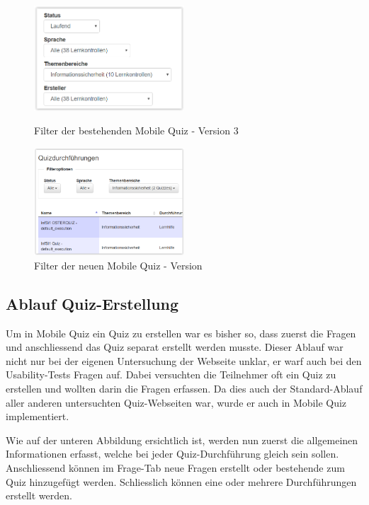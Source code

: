 \begin{figure}[H]
	\centering
	\includegraphics[width=0.5\textwidth]{Images/Alte_Filter_Mobile_Quiz.PNG}
	\caption{Filter der bestehenden Mobile Quiz - Version 3}
	\cite{mobilequiz.ch}
\end{figure}

\begin{figure}[H]
	\centering
	\includegraphics[width=0.5\textwidth]{Images/Neue_Filter_Mobile_Quiz.PNG}
	\caption{Filter der neuen Mobile Quiz - Version}
\end{figure}



\subsection{Ablauf Quiz-Erstellung}
\label{subsec:quiz-erstellung}

Um in Mobile Quiz ein Quiz zu erstellen war es bisher so, dass zuerst die Fragen und anschliessend das Quiz separat erstellt werden musste. Dieser Ablauf war nicht nur bei der eigenen Untersuchung der Webseite unklar, er warf auch bei den Usability-Tests Fragen auf. Dabei versuchten die Teilnehmer oft ein Quiz zu erstellen und wollten darin die Fragen erfassen. Da dies auch der Standard-Ablauf aller anderen untersuchten Quiz-Webseiten war, wurde er auch in Mobile Quiz implementiert.

Wie auf der unteren Abbildung ersichtlich ist, werden nun zuerst die allgemeinen Informationen erfasst, welche bei jeder Quiz-Durchführung gleich sein sollen. Anschliessend können im Frage-Tab neue Fragen erstellt oder bestehende zum Quiz hinzugefügt werden. Schliesslich können eine oder mehrere Durchführungen erstellt werden.

